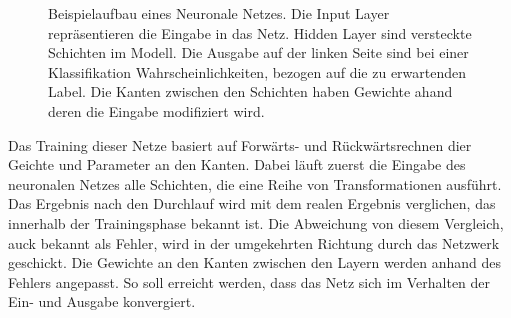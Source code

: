 \def\layersep{2.5cm}
\begin{figure}[!tb]\centering
{}
\caption[Beispielaufbau eines Neuronale Netzes]{Beispielaufbau eines Neuronale Netzes. Die Input Layer repräsentieren die Eingabe in das Netz. Hidden Layer sind versteckte Schichten im Modell. Die Ausgabe auf der linken Seite sind bei einer Klassifikation Wahrscheinlichkeiten, bezogen auf die  zu erwartenden Label. Die Kanten zwischen den Schichten haben Gewichte ahand deren die Eingabe modifiziert wird.}\label{cap:neuralnet}
\end{figure}\label{fig:neuralnet}

Das Training dieser Netze basiert auf Forwärts- und Rückwärtsrechnen dier Geichte und Parameter an den Kanten. Dabei läuft zuerst die Eingabe des neuronalen Netzes alle Schichten, die eine Reihe von Transformationen ausführt. Das Ergebnis nach den Durchlauf wird mit dem realen Ergebnis verglichen, das innerhalb der Trainingsphase bekannt ist. Die Abweichung von diesem Vergleich, auck bekannt als Fehler, wird in der umgekehrten Richtung durch das Netzwerk geschickt. Die Gewichte an den Kanten zwischen den Layern werden anhand des Fehlers angepasst. So soll erreicht werden, dass das Netz sich im Verhalten der Ein- und Ausgabe konvergiert.

